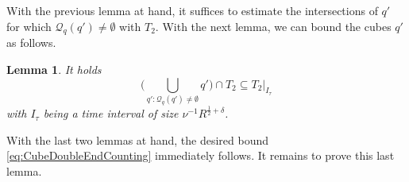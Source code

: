 \documentclass{amsart}
\newtheorem{lemma}[theorem]{Lemma}
\theoremstyle{definition}
\begin{document}
\smallskip

With the previous lemma at hand, it suffices to estimate the intersections of $q'$ for which $\mathcal{Q}_q(q') \neq \emptyset$ with $T_2$. With the next lemma, we can bound the cubes $q'$ as follows.

\begin{lemma}\label{l:transverse}
It holds
\begin{equation*}
\big( \bigcup_{q': \mathcal{Q}_{q} (q') \neq \emptyset } q' \big) \cap T_2 \subseteq  T_2 \vert_{I_{\tau}}
\end{equation*}
with $I_{\tau}$ being a time interval of size $\nu^{-1} R^{\frac{1}{2}+\delta}$.
\end{lemma}
With the last two lemmas at hand, the desired bound \eqref{eq:CubeDoubleEndCounting} immediately follows. It remains to prove this last lemma.
\end{document}
